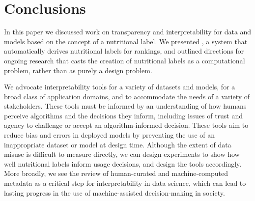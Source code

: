 \section{Conclusions}
\label{sec:conc}


In this paper we discussed work on transparency and interpretability for data and models based on the concept of a nutritional label. We presented \rf, a system that automatically derives nutritional labels for rankings, and outlined directions for ongoing research that casts the creation of nutritional labels as a computational problem, rather than as purely a design problem.  

We advocate interpretability tools for a variety of datasets and models, for a broad class of application domains, and to accommodate the needs of a variety of stakeholders.  These tools must be informed by an understanding of how humans perceive algorithms and the decisions they inform, including issues of trust and agency to challenge or accept an algorithm-informed decision.  These tools aim to reduce bias and errors in deployed models by preventing the use of an inappropriate dataset or model at design time.  Although the extent of data misuse is difficult to measure directly, we can design experiments to show how well nutritional labels inform usage decisions, and design the tools accordingly.  More broadly, we see the review of human-curated and machine-computed metadata as a critical step for interpretability in data science, which can lead to lasting progress in the use of machine-assisted decision-making in society.




